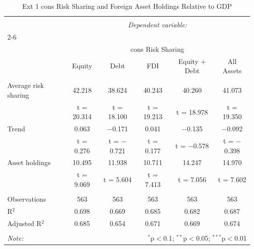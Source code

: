 
\begin{table}[!htbp] \centering 
  \caption{Ext 1 cons Risk Sharing and Foreign Asset Holdings Relative to GDP} 
  \label{} 
\begin{tabular}{@{\extracolsep{5pt}}lccccc} 
\\[-1.8ex]\hline 
\hline \\[-1.8ex] 
 & \multicolumn{5}{c}{\textit{Dependent variable:}} \\ 
\cline{2-6} 
\\[-1.8ex] & \multicolumn{5}{c}{cons Risk Sharing} \\ 
 & Equity & Debt & FDI & Equity + Debt & All Assets \\ 
\hline \\[-1.8ex] 
 Average risk sharing & 42.218 & 38.624 & 40.243 & 40.260 & 41.073 \\ 
  & t = 20.314 & t = 18.100 & t = 19.213 & t = 18.978 & t = 19.350 \\ 
  Trend & 0.063 & $-$0.171 & 0.041 & $-$0.135 & $-$0.092 \\ 
  & t = 0.276 & t = $-$0.721 & t = 0.177 & t = $-$0.578 & t = $-$0.398 \\ 
  Asset holdings & 10.495 & 11.938 & 10.711 & 14.247 & 14.970 \\ 
  & t = 9.069 & t = 5.604 & t = 7.413 & t = 7.056 & t = 7.602 \\ 
 \hline \\[-1.8ex] 
Observations & 563 & 563 & 563 & 563 & 563 \\ 
R$^{2}$ & 0.698 & 0.669 & 0.685 & 0.682 & 0.687 \\ 
Adjusted R$^{2}$ & 0.685 & 0.654 & 0.671 & 0.669 & 0.674 \\ 
\hline 
\hline \\[-1.8ex] 
\textit{Note:}  & \multicolumn{5}{r}{$^{*}$p$<$0.1; $^{**}$p$<$0.05; $^{***}$p$<$0.01} \\ 
\end{tabular} 
\end{table} 
